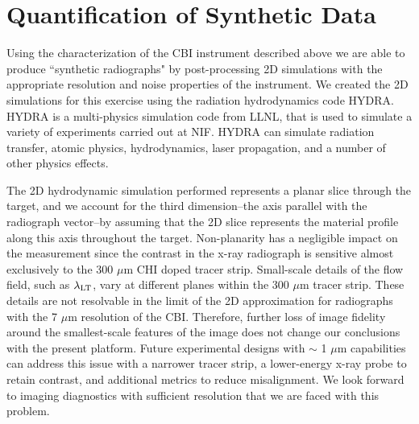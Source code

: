 \documentclass[%
 aip,
 amsmath,amssymb,
 reprint,
 floatfix
]{revtex4-1}
\begin{document}
\section{Quantification of Synthetic Data}



Using the characterization of the CBI instrument described above we are able to produce ``synthetic radiographs" by post-processing 2D simulations with the appropriate resolution and noise properties of the instrument. We created the 2D simulations for this exercise using the radiation hydrodynamics code HYDRA. \cite{HYDRAcite, Marinak_2001} HYDRA is a multi-physics simulation code
from LLNL, that is used to simulate a variety of experiments carried out at NIF. HYDRA can simulate radiation transfer, atomic physics, hydrodynamics,
laser propagation, and a number of other physics effects. \cite{Marinak_2001}

The 2D hydrodynamic simulation performed represents a planar slice through the target, and we account for the third dimension--the axis parallel with the radiograph vector--by assuming that the 2D slice represents the material profile along this axis throughout the target. Non-planarity has a negligible impact on the measurement since the contrast in the x-ray radiograph is sensitive almost exclusively to the 300 $\mu$m CHI doped tracer strip. Small-scale details of the flow field, such as $\lambda_{\rm{LT}}$, vary at different planes within the 300 $\mu$m tracer strip. These details are not resolvable in the limit of the 2D approximation for radiographs with the 7 $\mu$m resolution of the CBI.  Therefore, further loss of image fidelity around the smallest-scale features of the image does not change our conclusions with the present platform. Future experimental designs with $\sim$ 1 $\mu$m capabilities can address this issue with a narrower tracer strip, a lower-energy x-ray probe to retain contrast, and additional metrics to reduce misalignment. We look forward to imaging diagnostics with sufficient resolution that we are faced with this problem.
\end{document}
